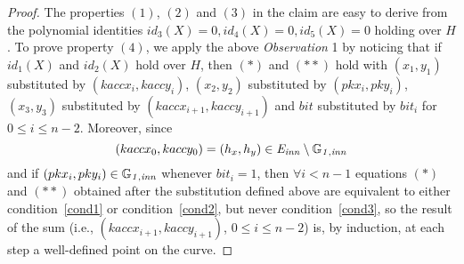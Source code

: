 \begin{proof} The properties $(1)$, $(2)$ and $(3)$ in the claim are easy to derive from the polynomial identities 
$id_3(X) =0, id_4(X )= 0, id_5(X) = 0$ holding over $H$. To prove property $(4)$, we apply 
the above \textit{Observation} 1 by noticing that if $id_1(X)$ and $id_2(X)$ hold over $H$, 
then $(\ast)$ and $(\ast \ast)$ hold with $(x_1, y_1)$ substituted by $(kaccx_i,kaccy_i)$, $(x_2, y_2)$ 
substituted by $(pkx_i, pky_i)$, $(x_3, y_3)$ substituted by $(kaccx_{i+1},kaccy_{i+1})$ and 
$\mathit{bit}$ substituted by $\mathit{bit}_i$ for $0 \leq i \leq n-2$. %
Moreover, since $$(kaccx_{0}, kaccy_{0}) = (h_x, h_y) \in \mathit{E}_{\mathit{inn}} \setminus \mathbb{G}_{\mathit{1,inn}}$$ 
and if $(pkx_i, pky_i) \in \mathbb{G}_{\mathit{1,inn}}$ whenever $\mathit{bit}_i = 1$, then $\forall i < n-1$ 
equations $(\ast)$ and $(\ast \ast)$ obtained after the substitution defined above are equivalent to either 
condition~\ref{cond1} or condition~\ref{cond2}, but never condition~\ref{cond3}, so the result of the sum (i.e., $(kaccx_{i+1}, kaccy_{i+1})$, $0\leq i \leq n-2$) is, 
by induction, at each step a well-defined point on the curve.%
\end{proof}
\vspace{-0.1in}

\begin{comment}
\begin{corollary} Assume $\forall i < n-1$ 
such that $\mathit{bit}_i = 1$, $pk_i = (pkx_i, pky_i) \in \ginn{1}$. 
If the polynomial identities $id_i(X) = 0, \forall i \in [4],$ hold over range $H$ and 
$\mathit{bit_i} \in \mathbb{B}$, $\forall i < n-1$ and $b(X) = \sum_{i=0}^{n-1} \mathit{bit_i} \cdot L_i(X)$
then:  \\
$(kaccx_{0}, kaccy_{0}) = (h_x, h_y)$, \\
$(kaccx_{n-1}, kaccy_{n-1}) = (h_x, h_y) \oplus (apk_x, apk_y)$, \\
$(kaccx_{i+1}, kaccy_{i+1}) =  (kaccx_{i}, kaccy_{i}) \oplus \mathit{bit_i}(pkx_{i}, pky_{i})$, $\forall i < n-1$.
\label{corollary:keys_affine_comm}
\end{corollary}
\vspace{-0.2in}

\begin{proof}The proof follows trivially from the general result stated by Claim~\ref{claim:keys_affine_comm}. 
\end{proof}
\vspace{-0.1in}
\end{comment}
